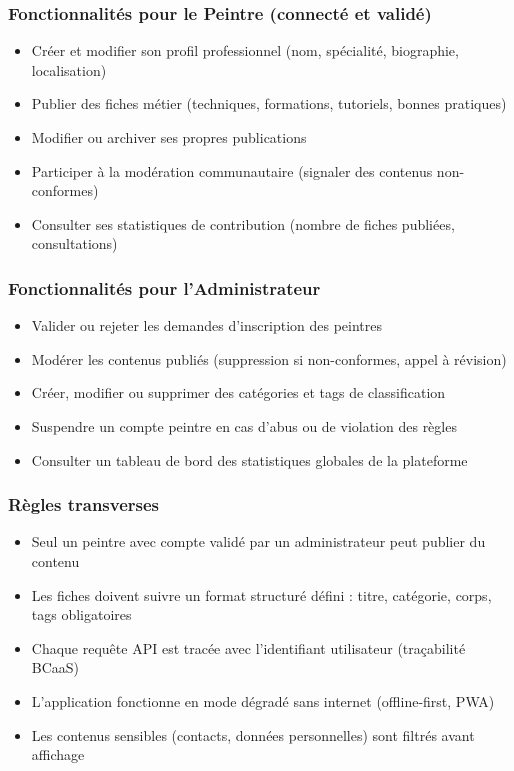 \documentclass[12pt,a4paper]{report}
\begin{document}
\subsubsection*{Fonctionnalités pour le Peintre (connecté et validé)}

\begin{itemize}[leftmargin=1.5cm]
  \item Créer et modifier son profil professionnel (nom, spécialité, biographie, localisation)
  \item Publier des fiches métier (techniques, formations, tutoriels, bonnes pratiques)
  \item Modifier ou archiver ses propres publications
  \item Participer à la modération communautaire (signaler des contenus non-conformes)
  \item Consulter ses statistiques de contribution (nombre de fiches publiées, consultations)
\end{itemize}

\subsubsection*{Fonctionnalités pour l'Administrateur}

\begin{itemize}[leftmargin=1.5cm]
  \item Valider ou rejeter les demandes d'inscription des peintres
  \item Modérer les contenus publiés (suppression si non-conformes, appel à révision)
  \item Créer, modifier ou supprimer des catégories et tags de classification
  \item Suspendre un compte peintre en cas d'abus ou de violation des règles
  \item Consulter un tableau de bord des statistiques globales de la plateforme
\end{itemize}

\subsubsection*{Règles transverses}

\begin{itemize}[leftmargin=1.5cm]
  \item Seul un peintre avec compte validé par un administrateur peut publier du contenu
  \item Les fiches doivent suivre un format structuré défini : titre, catégorie, corps, tags obligatoires
  \item Chaque requête API est tracée avec l'identifiant utilisateur (traçabilité BCaaS)
  \item L'application fonctionne en mode dégradé sans internet (offline-first, PWA)
  \item Les contenus sensibles (contacts, données personnelles) sont filtrés avant affichage
\end{itemize}
\end{document}

